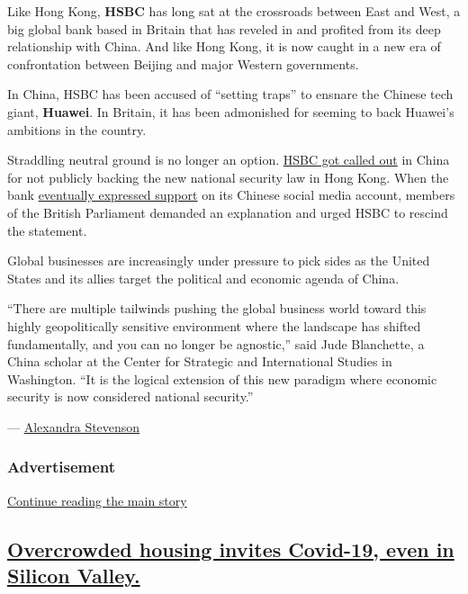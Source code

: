 Like Hong Kong, \textbf{HSBC} has long sat at the crossroads between
East and West, a big global bank based in Britain that has reveled in
and profited from its deep relationship with China. And like Hong Kong,
it is now caught in a new era of confrontation between Beijing and major
Western governments.

In China, HSBC has been accused of ``setting traps'' to ensnare the
Chinese tech giant, \textbf{Huawei}. In Britain, it has been admonished
for seeming to back Huawei's ambitions in the country.

Straddling neutral ground is no longer an option.
\href{https://www.nytimes.com/2020/05/31/business/hong-kong-china-business.html}{HSBC
got called out} in China for not publicly backing the new national
security law in Hong Kong. When the bank
\href{https://www.nytimes.com/2020/06/03/business/china-hong-kong-damage.html}{eventually
expressed support} on its Chinese social media account, members of the
British Parliament demanded an explanation and urged HSBC to rescind the
statement.

Global businesses are increasingly under pressure to pick sides as the
United States and its allies target the political and economic agenda of
China.

``There are multiple tailwinds pushing the global business world toward
this highly geopolitically sensitive environment where the landscape has
shifted fundamentally, and you can no longer be agnostic,'' said Jude
Blanchette, a China scholar at the Center for Strategic and
International Studies in Washington. ``It is the logical extension of
this new paradigm where economic security is now considered national
security.''

--- \href{https://www.nytimes.com/by/alexandra-stevenson}{Alexandra
Stevenson}

\hypertarget{advertisement-2}{%
\subsubsection{Advertisement}\label{advertisement-2}}

\protect\hyperlink{after-dfp-ad-mid3}{Continue reading the main story}

\hypertarget{overcrowded-housing-invites-covid-19-even-in-silicon-valley}{%
\subsection{\texorpdfstring{\protect\hyperlink{overcrowded-housing-invites-covid-19-even-in-silicon-valley}{Overcrowded
housing invites Covid-19, even in Silicon
Valley.}}{Overcrowded housing invites Covid-19, even in Silicon Valley.}}\label{overcrowded-housing-invites-covid-19-even-in-silicon-valley}}

